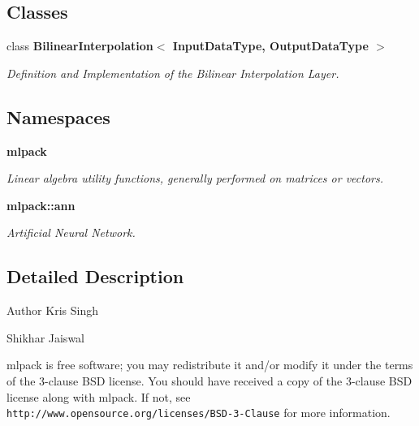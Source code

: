 \subsection*{Classes}
\begin{DoxyCompactItemize}
\item 
class \textbf{ Bilinear\+Interpolation$<$ Input\+Data\+Type, Output\+Data\+Type $>$}
\begin{DoxyCompactList}\small\item\em Definition and Implementation of the Bilinear Interpolation Layer. \end{DoxyCompactList}\end{DoxyCompactItemize}
\subsection*{Namespaces}
\begin{DoxyCompactItemize}
\item 
 \textbf{ mlpack}
\begin{DoxyCompactList}\small\item\em Linear algebra utility functions, generally performed on matrices or vectors. \end{DoxyCompactList}\item 
 \textbf{ mlpack\+::ann}
\begin{DoxyCompactList}\small\item\em Artificial Neural Network. \end{DoxyCompactList}\end{DoxyCompactItemize}


\subsection{Detailed Description}
\begin{DoxyAuthor}{Author}
Kris Singh 

Shikhar Jaiswal
\end{DoxyAuthor}
mlpack is free software; you may redistribute it and/or modify it under the terms of the 3-\/clause B\+SD license. You should have received a copy of the 3-\/clause B\+SD license along with mlpack. If not, see {\tt http\+://www.\+opensource.\+org/licenses/\+B\+S\+D-\/3-\/\+Clause} for more information. 